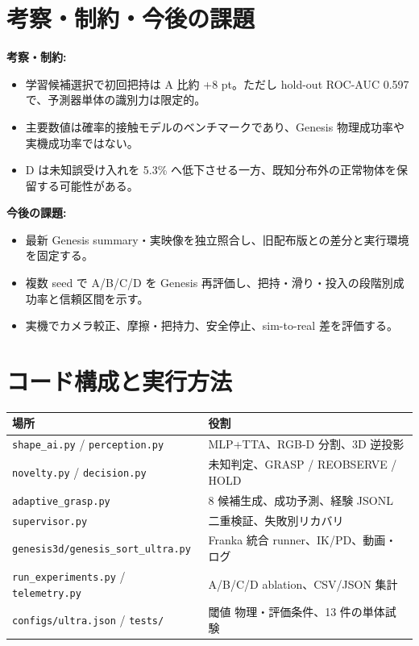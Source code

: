 \documentclass[11pt, a4paper]{article}
\begin{document}
\vspace{3mm}

\section{考察・制約・今後の課題}
\textbf{考察・制約:}
\begin{itemize}
    \item 学習候補選択で初回把持は A 比約 +8 pt。ただし hold-out ROC-AUC 0.597 で、予測器単体の識別力は限定的。
    \item 主要数値は確率的接触モデルのベンチマークであり、Genesis 物理成功率や実機成功率ではない。
    \item D は未知誤受け入れを 5.3\% へ低下させる一方、既知分布外の正常物体を保留する可能性がある。
\end{itemize}

\noindent
\textbf{今後の課題:}
\begin{itemize}
    \item 最新 Genesis summary・実映像を独立照合し、旧配布版との差分と実行環境を固定する。
    \item 複数 seed で A/B/C/D を Genesis 再評価し、把持・滑り・投入の段階別成功率と信頼区間を示す。
    \item 実機でカメラ較正、摩擦・把持力、安全停止、sim-to-real 差を評価する。
\end{itemize}

\vspace{3mm}

\section{コード構成と実行方法}

\begin{table}[h!]
\centering
\small
\begin{tabularx}{\textwidth}{@{} l X @{}}
\toprule
\textbf{場所} & \textbf{役割} \\
\midrule
\texttt{shape\_ai.py} / \texttt{perception.py} & MLP+TTA、RGB-D 分割、3D 逆投影 \\
\texttt{novelty.py} / \texttt{decision.py} & 未知判定、GRASP / REOBSERVE / HOLD \\
\texttt{adaptive\_grasp.py} & 8 候補生成、成功予測、経験 JSONL \\
\texttt{supervisor.py} & 二重検証、失敗別リカバリ \\
\texttt{genesis3d/genesis\_sort\_ultra.py} & Franka 統合 runner、IK/PD、動画・ログ \\
\texttt{run\_experiments.py} / \texttt{telemetry.py} & A/B/C/D ablation、CSV/JSON 集計 \\
\texttt{configs/ultra.json} / \texttt{tests/} & 閾値 物理・評価条件、13 件の単体試験 \\
\bottomrule
\end{tabularx}
\end{table}
\end{document}
